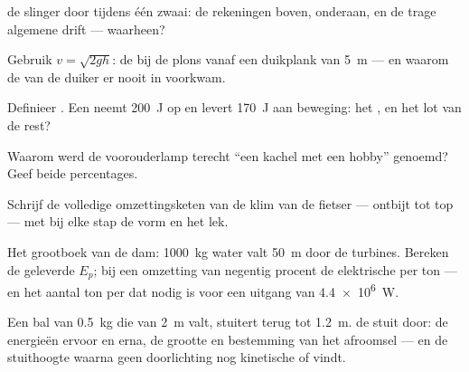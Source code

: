 \begin{exercise}[$\star$]\label{exo:g9:energy-conversions:4}
 de slinger door tijdens één zwaai: de rekeningen boven, onderaan,
en de trage algemene drift --- waarheen?
\end{exercise}

\begin{exercise}[$\star$]\label{exo:g9:energy-conversions:5}
Gebruik $v = \sqrt{2 g h}$: de  bij de plons vanaf een
duikplank van \qty{5}{m} --- en waarom de  van de duiker er
nooit in voorkwam.
\end{exercise}

\begin{exercise}[$\star$]\label{exo:g9:energy-conversions:6}
Definieer . Een  neemt \qty{200}{J} op en
levert \qty{170}{J} aan beweging: het , en het lot
van de rest?
\end{exercise}

\begin{exercise}[$\star$]\label{exo:g9:energy-conversions:7}
Waarom werd de voorouderlamp terecht ``een kachel met een hobby''
genoemd? Geef beide percentages.
\end{exercise}

\begin{exercise}[$\star$]\label{exo:g9:energy-conversions:8}
Schrijf de volledige omzettingsketen van de klim van de fietser ---
ontbijt tot top --- met bij elke stap de vorm en het lek.
\end{exercise}

\begin{exercise}[$\star\star$]\label{exo:g9:energy-conversions:9}
Het grootboek van de dam: \qty{1000}{kg} water valt \qty{50}{m} door de
turbines. Bereken de geleverde $E_p$; bij een omzetting van negentig
procent de elektrische  per ton --- en het aantal ton per
 dat nodig is voor een uitgang van \qty{4.4e6}{W}.
\end{exercise}

\begin{exercise}[$\star\star$]\label{exo:g9:energy-conversions:10}
Een bal van \qty{0.5}{kg} die van \qty{2}{m} valt, stuitert terug tot
\qty{1.2}{m}.  de stuit door: de energieën ervoor en erna, de
grootte en bestemming van het afroomsel --- en de stuithoogte waarna
geen doorlichting nog kinetische of  vindt.
\end{exercise}

